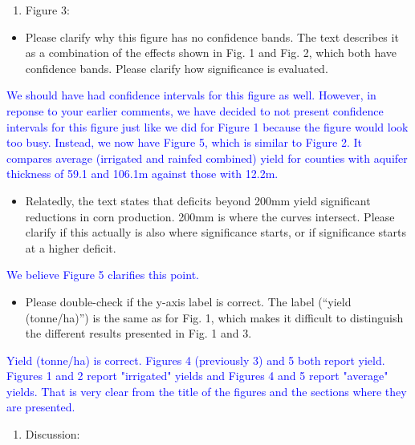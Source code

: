 \documentclass[
]{article}
\providecommand{\tightlist}{%
  \setlength{\itemsep}{0pt}\setlength{\parskip}{0pt}}
\begin{document}
\textcolor{blue}{}

\begin{enumerate}
\def\labelenumi{\arabic{enumi}.}
\setcounter{enumi}{3}
\tightlist
\item
  Figure 3:
\end{enumerate}

\begin{itemize}
\tightlist
\item
  Please clarify why this figure has no confidence bands. The text
  describes it as a combination of the effects shown in Fig. 1 and Fig.
  2, which both have confidence bands. Please clarify how significance
  is evaluated.
\end{itemize}

\textcolor{blue}{
We should have had confidence intervals for this figure as well. However, in reponse to your earlier comments, we have decided to not present confidence intervals for this figure just like we did for Figure 1 because the figure would look too busy. Instead, we now have Figure 5, which is similar to Figure 2. It compares average (irrigated and rainfed combined) yield for counties with aquifer thickness of 59.1 and 106.1m against those with 12.2m. 
}

\begin{itemize}
\tightlist
\item
  Relatedly, the text states that deficits beyond 200mm yield
  significant reductions in corn production. 200mm is where the curves
  intersect. Please clarify if this actually is also where significance
  starts, or if significance starts at a higher deficit.
\end{itemize}

\textcolor{blue}{We believe Figure 5 clarifies this point.}

\begin{itemize}
\tightlist
\item
  Please double-check if the y-axis label is correct. The label (``yield
  (tonne/ha)'') is the same as for Fig. 1, which makes it difficult to
  distinguish the different results presented in Fig. 1 and 3.
\end{itemize}

\textcolor{blue}{Yield (tonne/ha) is correct. Figures 4 (previously 3) and 5 both report yield. Figures 1 and 2 report "irrigated" yields and Figures 4 and 5 report "average" yields. That is very clear from the title of the figures and the sections where they are presented.}

\begin{enumerate}
\def\labelenumi{\arabic{enumi}.}
\setcounter{enumi}{4}
\tightlist
\item
  Discussion:
\end{enumerate}
\end{document}
